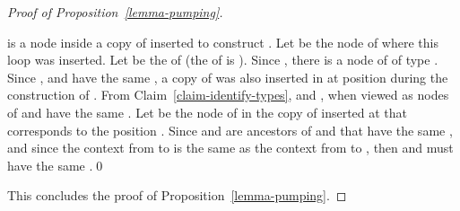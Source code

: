\begin{proof}[Proof of Proposition~\ref{lemma-pumping}]
\begin{iteMize}{}
\item  is a node inside a copy of  inserted to construct . Let  be the
  node of  where this loop was inserted. Let  be the \type{\kappa} of  (the \ktype of
   is ).  Since , there is a node  of  of
  type . Since ,  and  have the same , a
  copy of  was also inserted in  at position  during the
  construction of . From Claim~\ref{claim-identify-types},  and
  , when viewed as nodes of  and  have the same .  Let  be the node of  in the copy of
   inserted at  that corresponds to the position . Since  and
   are ancestors of  and  that have the same , and since the
  context from  to  is the same as the context from  to , then  and  must have the same
  .\qed
\end{iteMize}

\noindent This concludes the proof of Proposition~\ref{lemma-pumping}.
\end{proof}


